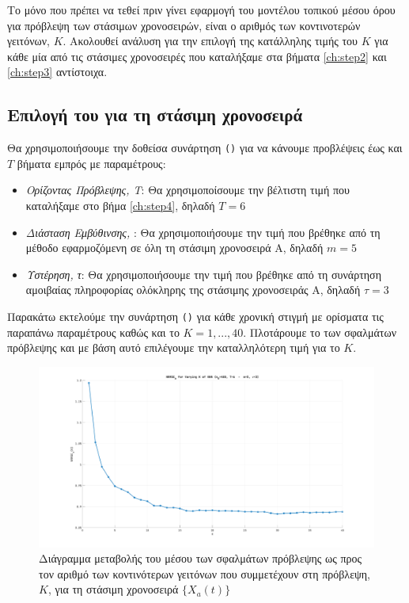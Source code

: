 \par Το μόνο που πρέπει να τεθεί πριν γίνει εφαρμογή του μοντέλου τοπικού μέσου όρου για πρόβλεψη των στάσιμων χρονοσειρών, είναι ο αριθμός των κοντινοτερών γειτόνων, $K$. Ακολουθεί ανάλυση για την επιλογή της κατάλληλης τιμής του $K$ για κάθε μία από τις στάσιμες χρονοσειρές που καταλήξαμε στα βήματα \ref{ch:step2} και \ref{ch:step3} αντίστοιχα.

\subsection{Επιλογή του  για τη στάσιμη χρονοσειρά }

Θα χρησιμοποιήσουμε την δοθείσα συνάρτηση \texttt{()} για να κάνουμε προβλέψεις έως και $T$ βήματα εμπρός με παραμέτρους:
\begin{itemize}
    \item \textit{Ορίζοντας Πρόβλεψης, Τ}: Θα χρησιμοποίσουμε την βέλτιστη τιμή που καταλήξαμε στο βήμα \ref{ch:step4}, δηλαδή $T=6$
    \item \textit{Διάσταση Εμβύθινσης, }: Θα χρησιμοποιήσουμε την τιμή που βρέθηκε από τη μέθοδο  εφαρμοζόμενη σε όλη τη στάσιμη χρονοσειρά Α, δηλαδή $m=5$
    \item \textit{Υστέρηση, τ}: Θα χρησιμοποιήσουμε την τιμή που βρέθηκε από τη συνάρτηση αμοιβαίας πληροφορίας ολόκληρης της στάσιμης χρονοσειράς Α, δηλαδή $\tau=3$
\end{itemize}

Παρακάτω εκτελούμε την συνάρτηση \texttt{()}  για κάθε χρονική στιγμή με ορίσματα τις παραπάνω παραμέτρους καθώς και το $K=1,...,40$. Πλοτάρουμε το  των σφαλμάτων πρόβλεψης και με βάση αυτό επιλέγουμε την καταλληλότερη τιμή για το $K$.

\begin{figure}[H]
    \begin{center}
        \includegraphics[width=\textwidth]{assets/images/plots/nrmse_k_a.svg.pdf}
        \caption{Διάγραμμα μεταβολής του μέσου  των σφαλμάτων πρόβλεψης ως προς τον αριθμό των κοντινότερων γειτόνων που συμμετέχουν στη πρόβλεψη, $K$, για τη στάσιμη χρονοσειρά $\{X_a(t)\}$}
        \label{fig:nrmse_k_a}
    \end{center}
\end{figure}


